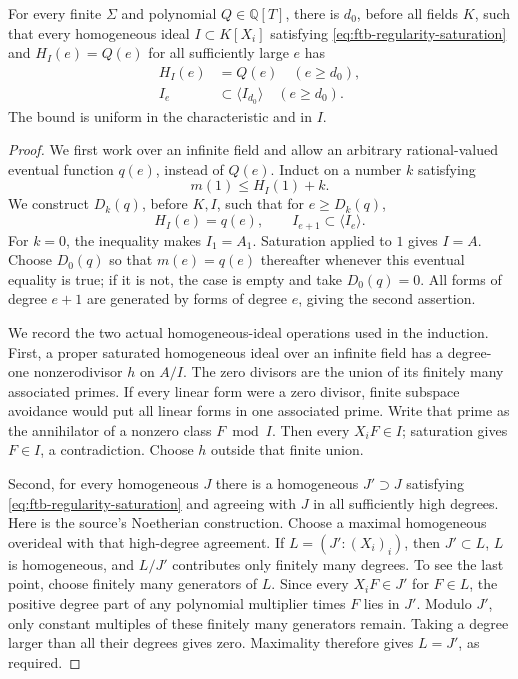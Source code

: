 \begin{lemma}
\label{lem:ftb-uniform-regularity}
For every finite \(\Sigma\) and polynomial
\(Q\in\mathbb Q[T]\), there is \(d_0\), before all fields
\(K\), such that every homogeneous ideal \(I\subset K[X_i]\)
satisfying \eqref{eq:ftb-regularity-saturation} and
\(H_I(e)=Q(e)\) for all sufficiently large \(e\) has
\[
 \begin{split}
 H_I(e)&=Q(e)\quad(e\ge d_0),\\
 I_e&\subset\langle I_{d_0}\rangle\quad(e\ge d_0).
 \end{split}
 \tag{R8}\label{eq:ftb-source-regularity}
\]
The bound is uniform in the characteristic and in \(I\).
\end{lemma}
\begin{proof}
We first work over an infinite field and allow an arbitrary
rational-valued eventual function \(q(e)\), instead of
\(Q(e)\).
Induct on a number \(k\) satisfying
\[
                              m(1)\le H_I(1)+k.
\]
We construct \(D_k(q)\), before \(K,I\), such that for
\(e\ge D_k(q)\),
\[
 H_I(e)=q(e),\qquad
                  I_{e+1}\subset\langle I_e\rangle .
 \tag{R9}\label{eq:ftb-regularity-one-step}
\]
For \(k=0\), the inequality makes \(I_1=A_1\).
Saturation applied to \(1\) gives \(I=A\).
Choose \(D_0(q)\) so that \(m(e)=q(e)\) thereafter
whenever this eventual equality is true; if it is not,
the case is empty and take \(D_0(q)=0\).
All forms of degree \(e+1\) are generated by forms of
degree \(e\), giving the second assertion.

We record the two actual homogeneous-ideal operations
used in the induction.
First, a proper saturated homogeneous ideal over an
infinite field has a degree-one nonzerodivisor \(h\)
on \(A/I\).
The zero divisors are the union of its finitely many
associated primes.
If every linear form were a zero divisor, finite
subspace avoidance would put all linear forms in one
associated prime.
Write that prime as the annihilator of a nonzero
class \(F\bmod I\).
Then every \(X_iF\in I\); saturation gives \(F\in I\),
a contradiction.
Choose \(h\) outside that finite union.

Second, for every homogeneous \(J\) there is a homogeneous
\(J'\supset J\) satisfying
\eqref{eq:ftb-regularity-saturation} and agreeing with
\(J\) in all sufficiently high degrees.
Here is the source's Noetherian construction.
Choose a maximal homogeneous overideal with that
high-degree agreement.
If \(L=(J':(X_i)_i)\), then \(J'\subset L\), \(L\) is
homogeneous, and \(L/J'\) contributes only finitely
many degrees.
To see the last point, choose finitely many generators
of \(L\).
Since every \(X_iF\in J'\) for \(F\in L\), the positive
degree part of any polynomial multiplier times \(F\)
lies in \(J'\).
Modulo \(J'\), only constant multiples of these finitely
many generators remain.
Taking a degree larger than all their degrees gives
zero.
Maximality therefore gives \(L=J'\), as required.


\end{proof}

